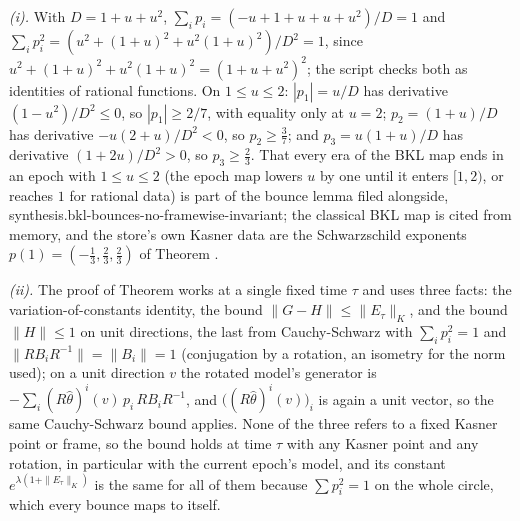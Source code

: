 \emph{(i).} With $D = 1 + u + u^{2}$, $\sum_{i}p_{i} = (-u + 1 + u + u + u^{2})/D = 1$ and $\sum_{i}p_{i}^{2} = (u^{2} + (1+u)^{2} + u^{2}(1+u)^{2})/D^{2} = 1$, since $u^{2} + (1+u)^{2} + u^{2}(1+u)^{2} = (1 + u + u^{2})^{2}$; the script checks both as identities of rational functions. On $1 \le u \le 2$: $|p_{1}| = u/D$ has derivative $(1 - u^{2})/D^{2} \le 0$, so $|p_{1}| \ge 2/7$, with equality only at $u = 2$; $p_{2} = (1 + u)/D$ has derivative $-u(2 + u)/D^{2} < 0$, so $p_{2} \ge \tfrac37$; and $p_{3} = u(1 + u)/D$ has derivative $(1 + 2u)/D^{2} > 0$, so $p_{3} \ge \tfrac23$. That every era of the BKL map ends in an epoch with $1 \le u \le 2$ (the epoch map lowers $u$ by one until it enters $[1, 2)$, or reaches $1$ for rational data) is part of the bounce lemma filed alongside, synthesis.bkl-bounces-no-framewise-invariant; the classical BKL map is cited from memory, and the store's own Kasner data are the Schwarzschild exponents $p(1) = (-\tfrac13, \tfrac23, \tfrac23)$ of Theorem .

\emph{(ii).} The proof of Theorem  works at a single fixed time $\tau$ and uses three facts: the variation-of-constants identity, the bound $\|G - H\| \le \|E_{\tau}\|_{K}$, and the bound $\|H\| \le 1$ on unit directions, the last from Cauchy-Schwarz with $\sum_{i}p_{i}^{2} = 1$ and $\|RB_{i}R^{-1}\| = \|B_{i}\| = 1$ (conjugation by a rotation, an isometry for the norm used); on a unit direction $v$ the rotated model's generator is $-\sum_{i}(R\hat\theta)^{i}(v)\,p_{i}\,RB_{i}R^{-1}$, and $\bigl((R\hat\theta)^{i}(v)\bigr)_{i}$ is again a unit vector, so the same Cauchy-Schwarz bound applies. None of the three refers to a fixed Kasner point or frame, so the bound holds at time $\tau$ with any Kasner point and any rotation, in particular with the current epoch's model, and its constant $e^{\lambda(1 + \|E_{\tau}\|_{K})}$ is the same for all of them because $\sum p_{i}^{2} = 1$ on the whole circle, which every bounce maps to itself.

